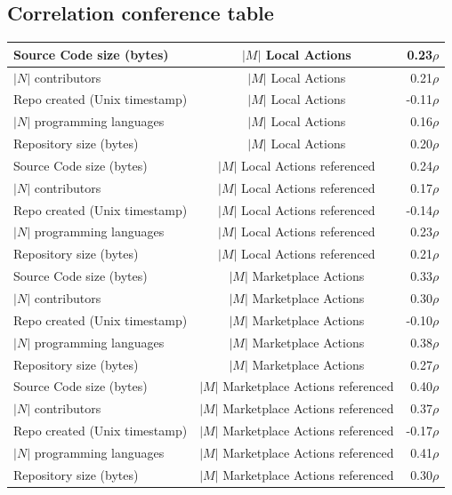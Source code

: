 \documentclass[conference]{IEEEtran}
\begin{document}
\subsection{Correlation conference table}
\begin{table}[h!]
  \centering
  \begin{tabular}{|l|c|r|}
    \hline
    Source Code size (bytes) & $|M|$ Local Actions & 0.23\(\rho\) \\
    \hline
    $|N|$ contributors &  $|M|$ Local Actions & 0.21\(\rho\) \\
    \hline
    Repo created (Unix timestamp) &  $|M|$ Local Actions & -0.11\(\rho\) \\
    \hline
    $|N|$ programming languages & $|M|$ Local Actions & 0.16\(\rho\) \\
    \hline
    Repository size (bytes) & $|M|$ Local Actions & 0.20\(\rho\) \\
    \hline
    Source Code size (bytes) & $|M|$ Local Actions referenced & 0.24\(\rho\)\\
    \hline
    $|N|$ contributors  & $|M|$ Local Actions referenced & 0.17\(\rho\) \\
    \hline
    Repo created (Unix timestamp) & $|M|$ Local Actions referenced & -0.14\(\rho\) \\
    \hline
    $|N|$ programming languages & $|M|$ Local Actions referenced & 0.23\(\rho\) \\
    \hline
    Repository size (bytes) & $|M|$ Local Actions referenced & 0.21\(\rho\) \\
    \hline
    Source Code size (bytes) & $|M|$ Marketplace Actions & 0.33\(\rho\) \\
    \hline
    $|N|$ contributors & $|M|$ Marketplace Actions & 0.30\(\rho\) \\
    \hline
    Repo created (Unix timestamp) & $|M|$ Marketplace Actions & -0.10\(\rho\) \\
    \hline
    $|N|$ programming languages & $|M|$ Marketplace Actions & 0.38\(\rho\) \\
    \hline
    Repository size (bytes) & $|M|$ Marketplace Actions & 0.27\(\rho\) \\
    \hline
    Source Code size (bytes) & $|M|$ Marketplace Actions referenced & 0.40\(\rho\) \\
    \hline
    $|N|$ contributors & $|M|$ Marketplace Actions referenced & 0.37\(\rho\) \\
    \hline
    Repo created (Unix timestamp) & $|M|$ Marketplace Actions referenced & -0.17\(\rho\) \\
    \hline
    $|N|$ programming languages & $|M|$ Marketplace Actions referenced & 0.41\(\rho\) \\
    \hline
    Repository size (bytes) & $|M|$ Marketplace Actions referenced & 0.30\(\rho\) \\
    \hline
  \end{tabular}
  \end{table}




\vspace{12pt}
\end{document}
